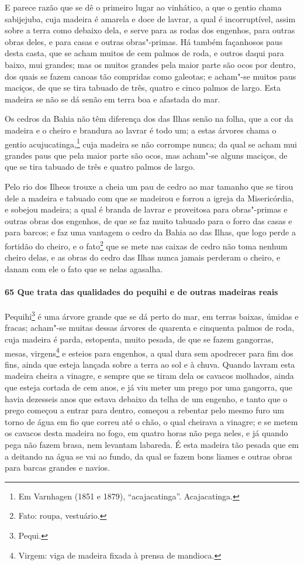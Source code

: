 E parece razão que se dê o primeiro lugar ao vinhático, a que o gentio chama sabijejuba,
cuja madeira é amarela e doce de lavrar, a qual é incorruptível, assim sobre a terra como
debaixo dela, e serve para as rodas dos engenhos, para outras obras deles, e para casas e
outras obras"-primas. Há também façanhosos paus desta casta, que se acham muitos de cem
palmos de roda, e outros daqui para baixo, mui grandes; mas os muitos grandes pela maior
parte são ocos por dentro, dos quais se fazem canoas tão compridas
como galeotas; e acham"-se muitos paus maciços, de que se tira tabuado de três, quatro e
cinco palmos de largo. Esta madeira se não se dá senão em terra boa e afastada do mar.


Os cedros da Bahia não têm diferença dos das Ilhas senão na folha, que a cor da madeira e
o cheiro e brandura ao lavrar é todo um; a estas árvores chama o gentio
acujucatinga,\footnote{ Em Varnhagen (1851 e 1879), ``acajacatinga''. Acajacatinga.} cuja
madeira se não corrompe nunca; da qual se acham mui grandes paus que pela maior parte são
ocos, mas acham"-se alguns maciços, de que se tira tabuado de três e quatro palmos de
largo.

Pelo rio dos Ilheos trouxe a cheia um pau de cedro ao mar tamanho que se tirou dele a
madeira e tabuado com que se madeirou e forrou a igreja da Misericórdia, e sobejou
madeira; a qual é branda de lavrar e proveitosa para obras"-primas e outras obras dos
engenhos, de que se faz muito tabuado para o forro das casas e para barcos; e faz uma
vantagem o cedro da Bahia ao das Ilhas, que logo perde a fortidão do cheiro, e o
fato\footnote{ Fato: roupa, vestuário.} que se mete nas caixas de cedro não toma nenhum
cheiro delas, e as obras do cedro das Ilhas nunca jamais perderam o cheiro, e
danam com ele o fato que se nelas agasalha.

\paragraph{65 Que trata das qualidades do pequihi e de outras madeiras reais}

Pequihi\footnote{ Pequi.} é uma árvore grande que se dá perto do mar, em terras baixas,
úmidas e fracas; acham"-se muitas dessas árvores de quarenta e cinquenta palmos de roda,
cuja madeira é parda, estopenta, muito pesada, de que se fazem gangorras, mesas,
virgens\footnote{ Virgem: viga de madeira fixada à prensa de mandioca.} e esteios para
engenhos, a qual dura sem apodrecer para fim dos fins, ainda que esteja lançada sobre a
terra ao sol e à chuva. Quando lavram esta madeira cheira a vinagre, e sempre que se tiram
dela os cavacos molhados, ainda que esteja cortada de cem anos, e já viu meter um prego
por uma gangorra, que havia dezesseis anos que estava debaixo da telha de um engenho, e
tanto que o prego começou a entrar para dentro, começou a rebentar pelo mesmo furo um
torno de água em fio que correu até o chão, o qual cheirava a vinagre; e se metem os
cavacos desta madeira no fogo, em quatro horas não pega neles, e já quando pega não fazem
brasa, nem levantam labareda. É esta madeira tão pesada que em a deitando na água se vai
ao fundo, da qual se fazem bons liames e outras obras para barcas grandes e navios.

